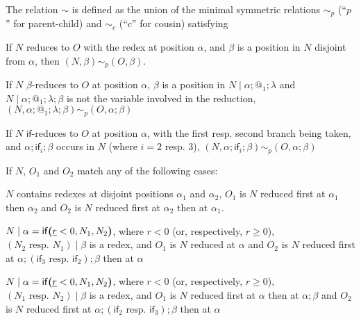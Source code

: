 \medskip %
\begin{definition}\rm \label{defn:sim}
The relation $\sim$ is defined as the union of the minimal symmetric relations $\sim_p$ (``$p$'' for parent-child) and $\sim_c$ (``$c$'' for cousin) satisfying
\begin{compactenum}[(i)]
    \item If $N$ reduces to $O$ with the redex at position $\alpha$, and $\beta$ is a position in $N$ disjoint from $\alpha$, then $(N,\beta) \sim_p (O,\beta)$.
    
    \item If $N$ $\beta$-reduces to $O$ at position $\alpha$, $\beta$ is a position in $N \mid \alpha;@_1;\lambda$ and $N \mid \alpha;@_1;\lambda;\beta$ is not the variable involved in the reduction, $(N,\alpha;@_1;\lambda;\beta) \sim_p (O, \alpha;\beta)$
    
    \item If $N$ $\textsf{if}$-reduces to $O$ at position $\alpha$, with the first resp. second branch being taken, and $\alpha;\textsf{if}_i;\beta$ occurs in $N$ (where $i = 2$ resp. $3$), $(N,\alpha;\textsf{if}_i;\beta) \sim_p (O,\alpha;\beta)$
    
    \item If $N$, $O_1$ and $O_2$ match any of the following cases:
    \begin{compactenum}
        \item $N$ contains redexes at disjoint positions $\alpha_1$ and $\alpha_2$, $O_1$ is $N$ reduced first at $\alpha_1$ then $\alpha_2$ and $O_2$ is $N$ reduced first at $\alpha_2$ then at $\alpha_1$.
        
        \item $N \mid \alpha = \mathsf{if}\boldsymbol{(}\underline r < 0, N_1, N_2\boldsymbol{)}$, where $r < 0$ (or, respectively, $r \geq 0$), $(N_2 \text{ resp. } N_1) \mid \beta$ is a redex, and $O_1$ is $N$ reduced at $\alpha$ and $O_2$ is $N$ reduced first at $\alpha;(\textsf{if}_3 \text{ resp. } \textsf{if}_2);\beta$ then at $\alpha$
        
        \item $N \mid \alpha = \mathsf{if}\boldsymbol{(}\underline r < 0, N_1, N_2\boldsymbol{)}$, where $r < 0$ (or, respectively, $r \geq 0$), $(N_1 \text{ resp. } N_2) \mid \beta$ is a redex, and $O_1$ is $N$ reduced first at $\alpha$ then at $\alpha;\beta$ and $O_2$ is $N$ reduced first at $\alpha;(\textsf{if}_2 \text{ resp. } \textsf{if}_3);\beta$ then at $\alpha$
        

\end{compactenum}
\end{compactenum}
\end{definition}
